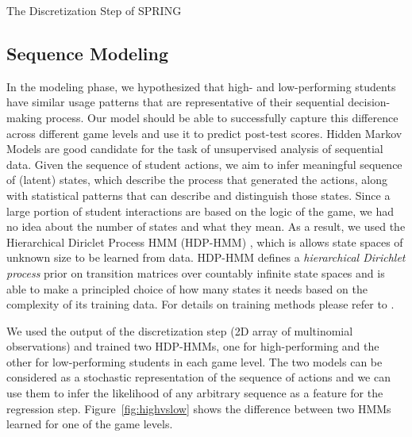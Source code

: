 \documentclass{sigchi}
\def\algname{SPRING\xspace}
\begin{document}
\begin{algorithm}
	\begin{algorithmic}
		\EndIf
		\EndFor
		\EndFor
		\State
		\EndFor
		\State
		\EndFor
		\EndFor
		\State {}
		\EndProcedure
		
	\end{algorithmic}
	\caption{The Discretization Step of \algname \label{alg:discretize}}
\end{algorithm}



\subsection{Sequence Modeling}
In the modeling phase, we hypothesized that high- and low-performing students have similar usage patterns that are representative of their sequential decision-making process. 
Our model should be able to successfully capture this difference across different game levels and use it to predict post-test scores.
Hidden Markov Models are good candidate for the task of unsupervised analysis of sequential data.
Given the sequence of student actions, we aim to infer meaningful sequence of (latent) states, which describe the process that generated the actions, along with statistical patterns that can describe and distinguish those states.
Since a large portion of student interactions are based on the logic of the game, we had no idea about the number of states and what they mean.
As a result, we used the Hierarchical Diriclet Process HMM (HDP-HMM) \cite{fox2008hdp}, which is allows state spaces of unknown size to be learned from data. 
HDP-HMM defines a \textit{hierarchical Dirichlet process} prior on transition matrices over countably infinite state spaces and is able to make a principled choice of how many states it needs based on the complexity of its training data. 
For details on training methods please refer to \cite{fox2008hdp}.

We used the output of the discretization step (2D array of multinomial observations) and trained two HDP-HMMs, one for high-performing and the other for low-performing students in each game level. The two models can be considered as a stochastic representation of the sequence of actions and we can use them to infer the likelihood of any arbitrary sequence as a feature for the regression step. Figure~\ref{fig:highvslow} shows the difference between two HMMs learned for one of the game levels. 
\end{document}
